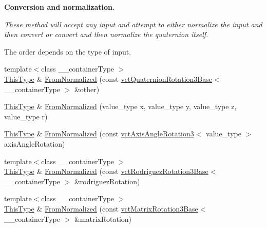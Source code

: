 \begin{Indent}{\bf Conversion and normalization.}\par
{\em These method will accept any input and attempt to either normalize the input and then convert or convert and then normalize the quaternion itself.\par
The order depends on the type of input. }\begin{DoxyCompactItemize}
\item 
{\footnotesize template$<$class \-\_\-\-\_\-container\-Type $>$ }\\\hyperlink{classvct_quaternion_base_af28efdc38acf89acb7a67afada11408c}{This\-Type} \& \hyperlink{classvct_quaternion_rotation3_base_afd47a2757a43293b69825cc1d5a1d47c}{From\-Normalized} (const \hyperlink{classvct_quaternion_rotation3_base}{vct\-Quaternion\-Rotation3\-Base}$<$ \-\_\-\-\_\-container\-Type $>$ \&other)
\item 
\hyperlink{classvct_quaternion_base_af28efdc38acf89acb7a67afada11408c}{This\-Type} \& \hyperlink{classvct_quaternion_rotation3_base_a45b5b924af0ce4cffde44a71eb907448}{From\-Normalized} (value\-\_\-type x, value\-\_\-type y, value\-\_\-type z, value\-\_\-type r)
\item 
\hyperlink{classvct_quaternion_base_af28efdc38acf89acb7a67afada11408c}{This\-Type} \& \hyperlink{classvct_quaternion_rotation3_base_a8da7956fa2689bc098cd54aa8d876c50}{From\-Normalized} (const \hyperlink{classvct_axis_angle_rotation3}{vct\-Axis\-Angle\-Rotation3}$<$ value\-\_\-type $>$ axis\-Angle\-Rotation)
\item 
{\footnotesize template$<$class \-\_\-\-\_\-container\-Type $>$ }\\\hyperlink{classvct_quaternion_base_af28efdc38acf89acb7a67afada11408c}{This\-Type} \& \hyperlink{classvct_quaternion_rotation3_base_a4f5a76c0336a1c208d537c3f0e4d10ff}{From\-Normalized} (const \hyperlink{classvct_rodriguez_rotation3_base}{vct\-Rodriguez\-Rotation3\-Base}$<$ \-\_\-\-\_\-container\-Type $>$ \&rodriguez\-Rotation)
\item 
{\footnotesize template$<$class \-\_\-\-\_\-container\-Type $>$ }\\\hyperlink{classvct_quaternion_base_af28efdc38acf89acb7a67afada11408c}{This\-Type} \& \hyperlink{classvct_quaternion_rotation3_base_aca57ab3ef2841ef2c07a93018909fbad}{From\-Normalized} (const \hyperlink{classvct_matrix_rotation3_base}{vct\-Matrix\-Rotation3\-Base}$<$ \-\_\-\-\_\-container\-Type $>$ \&matrix\-Rotation)
\end{DoxyCompactItemize}
\end{Indent}
